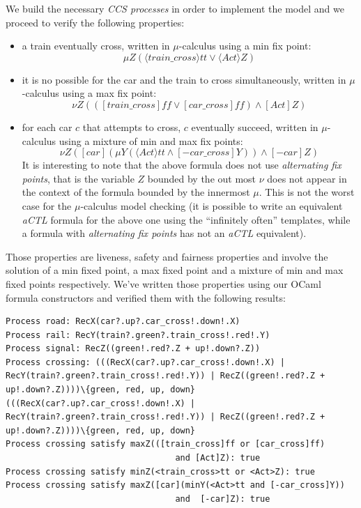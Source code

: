 We build the necessary \emph{CCS processes} in order to implement the
model and we proceed to verify the following properties:
\begin{itemize}
\item a train eventually cross, written in $\mu$-calculus using a min
  fix point:
  \begin{displaymath}
    \mu Z(\langle train\_cross\rangle tt \vee \langle Act
    \rangle Z)
  \end{displaymath}
\item it is no possible for the car and the train to cross
  simultaneously, written in $\mu$-calculus using a max fix point:
  \begin{displaymath}
    \nu Z(([train\_cross]ff \vee [car\_cross]ff) \wedge [Act]Z)
  \end{displaymath}
\item for each car $c$ that attempts to cross, $c$ eventually succeed,
  written in $\mu$-calculus using a mixture of min and max fix points:
  \begin{displaymath}
    \nu Z([car](\mu Y(\langle Act \rangle tt \wedge [-car\_cross]Y))
    \wedge  [-car]Z)
  \end{displaymath}
  It is interesting to note that the above formula does not use
  \emph{alternating fix points}, that is the variable $Z$ bounded by
  the out most $\nu$ does not appear in the context of the formula
  bounded by the innermost $\mu$. This is not the worst case for the
  $\mu$-calculus model checking (it is possible to write an equivalent
  \emph{aCTL} formula for the above one using the ``infinitely often''
  templates, while a formula with \emph{alternating fix points} has
  not an \emph{aCTL} equivalent).
\end{itemize}
Those properties are liveness, safety and fairness properties and
involve the solution of a min fixed point, a max fixed point and a
mixture of min and max fixed points respectively. We've written those
properties using our OCaml formula constructors and verified them with
the following results:
\begin{verbatim}
Process road: RecX(car?.up?.car_cross!.down!.X)
Process rail: RecY(train?.green?.train_cross!.red!.Y)
Process signal: RecZ((green!.red?.Z + up!.down?.Z))
Process crossing: (((RecX(car?.up?.car_cross!.down!.X) |
RecY(train?.green?.train_cross!.red!.Y)) | RecZ((green!.red?.Z +
up!.down?.Z))))\{green, red, up, down}
(((RecX(car?.up?.car_cross!.down!.X) |
RecY(train?.green?.train_cross!.red!.Y)) | RecZ((green!.red?.Z +
up!.down?.Z))))\{green, red, up, down}
Process crossing satisfy maxZ(([train_cross]ff or [car_cross]ff)
                                  and [Act]Z): true
Process crossing satisfy minZ(<train_cross>tt or <Act>Z): true
Process crossing satisfy maxZ([car](minY(<Act>tt and [-car_cross]Y))
                                  and  [-car]Z): true
\end{verbatim}

